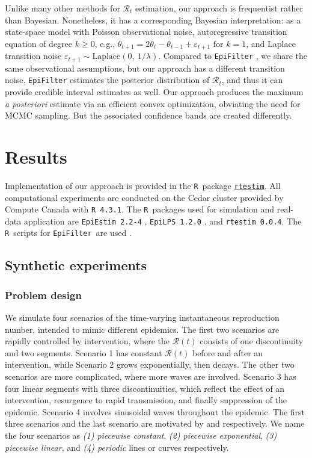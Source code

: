 \documentclass[10pt,letterpaper]{article}
\newcommand{\R}{\texttt{R}}
\def\EpiFilter{\texttt{EpiFilter}}
\def\calR{\mathcal{R}}
\begin{document}
Unlike many other methods for $\calR_t$ estimation, our approach is frequentist
rather than Bayesian. Nonetheless, it has a corresponding Bayesian
interpretation: as a state-space model with Poisson observational noise,
autoregressive transition equation of degree $k\geq 0$, e.g., $\theta_{t+1} =
2\theta_t - \theta_{t-1} + \varepsilon_{t+1}$ for $k=1$, and Laplace transition
noise $\varepsilon_{t+1}\sim \mathrm{Laplace}(0,\ 1/\lambda)$. Compared to
\texttt{EpiFilter} \cite{parag2021improved},
 we share the same observational assumptions, but our approach has a
different transition noise. \texttt{EpiFilter} estimates the posterior
distribution of
$\calR_t$, and thus it can provide credible interval estimates as well. Our
approach produces the maximum \emph{a posteriori} estimate via an efficient
convex optimization, obviating the need for MCMC sampling. But the associated
confidence bands are created differently.


\section{Results}

Implementation of our approach is provided in the \R\ package
\href{https://dajmcdon.github.io/rtestim/}{\texttt{rtestim}}. 
All computational experiments are conducted on the Cedar cluster provided 
by Compute Canada with \texttt{R 4.3.1}. The \R\ packages used for
simulation and real-data application are \texttt{EpiEstim 2.2-4} \cite{Cori2022},
\texttt{EpiLPS 1.2.0} \cite{Gressani2021}, and \texttt{rtestim 0.0.4}. 
The \R\ scripts for \EpiFilter\ are used \cite{kpzoo2020}.

\subsection{Synthetic experiments}

\subsubsection{Problem design}

We simulate four scenarios of the time-varying instantaneous reproduction number,
intended to mimic different epidemics. The first two scenarios are rapidly 
controlled by intervention, where the $\calR(t)$ consists
of one discontinuity and two segments. Scenario 1 has constant $\calR(t)$ before
and after an intervention, while Scenario 2 grows exponentially, then decays.
The other two scenarios are more complicated, where more waves
are involved. Scenario 3 has four linear segments with three discontinuities,
which reflect the effect of an intervention, resurgence to rapid transmission,
and finally suppression of the epidemic. Scenario 4 involves sinusoidal waves
throughout the epidemic.
The first three scenarios and the last scenario are motivated by
\cite{parag2021improved} and \cite{gressani2022epilps} respectively. 
We name the four scenarios as \textit{(1) piecewise constant}, \textit{(2) 
piecewise exponential}, \textit{(3) piecewise linear}, and \textit{(4) periodic} 
lines or curves respectively. 
\end{document}
